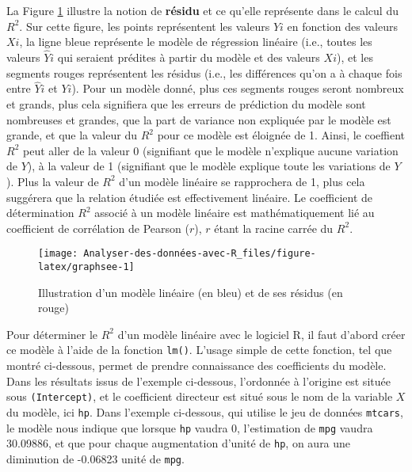 \documentclass[
  french,
]{book}
\begin{document}
La Figure \ref{fig:graphsee} illustre la notion de \textbf{résidu} et ce qu'elle représente dans le calcul du \(R^2\). Sur cette figure, les points représentent les valeurs \(Y{i}\) en fonction des valeurs \(X{i}\), la ligne bleue représente le modèle de régression linéaire (i.e., toutes les valeurs \(\hat{Y}{i}\) qui seraient prédites à partir du modèle et des valeurs \(X{i}\)), et les segments rouges représentent les résidus (i.e., les différences qu'on a à chaque fois entre \(\hat{Y}{i}\) et \(Y{i}\)). Pour un modèle donné, plus ces segments rouges seront nombreux et grands, plus cela signifiera que les erreurs de prédiction du modèle sont nombreuses et grandes, que la part de variance non expliquée par le modèle est grande, et que la valeur du \(R^2\) pour ce modèle est éloignée de 1. Ainsi, le coeffient \(R^2\) peut aller de la valeur 0 (signifiant que le modèle n'explique aucune variation de \(Y\)), à la valeur de 1 (signifiant que le modèle explique toute les variations de \(Y\)). Plus la valeur de \(R^2\) d'un modèle linéaire se rapprochera de 1, plus cela suggérera que la relation étudiée est effectivement linéaire. Le coefficient de détermination \(R^2\) associé à un modèle linéaire est mathématiquement lié au coefficient de corrélation de Pearson (\(r\)), \(r\) étant la racine carrée du \(R^2\).

\begin{figure}

{\centering \texttt{[image: Analyser-des-données-avec-R\_files/figure-latex/graphsee-1]} 

}

\caption{Illustration d'un modèle linéaire (en bleu) et de ses résidus (en rouge)}\label{fig:graphsee}
\end{figure}

Pour déterminer le \(R^2\) d'un modèle linéaire avec le logiciel R, il faut d'abord créer ce modèle à l'aide de la fonction \texttt{lm()}. L'usage simple de cette fonction, tel que montré ci-dessous, permet de prendre connaissance des coefficients du modèle. Dans les résultats issus de l'exemple ci-dessous, l'ordonnée à l'origine est située sous \texttt{(Intercept)}, et le coefficient directeur est situé sous le nom de la variable \(X\) du modèle, ici \texttt{hp}. Dans l'exemple ci-dessous, qui utilise le jeu de données \texttt{mtcars}, le modèle nous indique que lorsque \texttt{hp} vaudra 0, l'estimation de \texttt{mpg} vaudra 30.09886, et que pour chaque augmentation d'unité de \texttt{hp}, on aura une diminution de -0.06823 unité de \texttt{mpg}.
\end{document}
